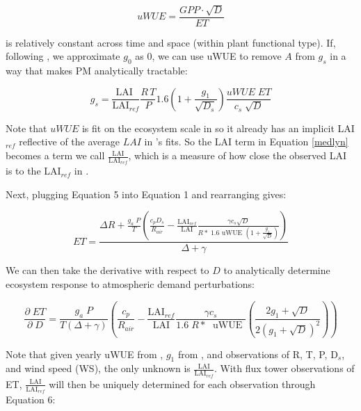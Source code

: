 \documentclass[draft,linenumbers]{agujournal}
\begin{document}
\begin{linenomath*}
  \begin{equation}
uWUE = \frac{GPP \cdot \sqrt{D}}{ET}
  \end{equation}
\end{linenomath*}
is relatively constant across time and space (within plant functional type). If, following \citet{Lin_2015}, we approximate $g_0$ as $0$, we can use uWUE to remove $A$ from $g_s$ in a way that makes PM analytically tractable:

\begin{linenomath*}
  \begin{equation}
  g_s = \frac{\text{LAI }}{\text{LAI$_{ref}$}} \frac{R \, T}{P} 1.6 \left(1 + \frac{g_1}{\sqrt{D_{s}}}\right) \frac{uWUE \; ET}{c_s \; \sqrt{D}}
  \end{equation}
\end{linenomath*}

Note that $uWUE$ is fit on the ecosystem scale in \citet{Zhou_2015} so it already has an implicit LAI$_{ref}$ reflective of the average $LAI$ in \citet{Zhou_2015}'s fits. So the LAI term in Equation \ref{medlyn} becomes a term we call $\frac{\text{LAI}}{\text{LAI$_{ref}$}}$, which is a measure of how close the observed LAI is to the LAI$_{ref}$ in \citet{Zhou_2015}.

Next, plugging Equation 5 into Equation 1 and rearranging gives:

\begin{linenomath*}
  \begin{equation}
  ET = \frac{\Delta R + \frac{g_a\; P}{T} \left( \frac{ c_p D_{s}}{R_{air}} - \frac{\text{LAI$_{ref}$}}{\text{LAI}}  \frac{\gamma c_s \sqrt{D} }{ R* \; 1.6 \text{ uWUE } (1 + \frac{g_1}{\sqrt{D}})} \right) }{ \Delta + \gamma}
  \end{equation}
\end{linenomath*}

We can then take the derivative with respect to $D$ to analytically determine ecosystem response to atmospheric demand perturbations:

\begin{linenomath*}
  \begin{equation}
    \frac{\partial \;  ET}{\partial \; D} = \frac{g_a \; P}{T(\Delta + \gamma)}   \left(\frac{ c_p}{R_{air}} - \frac{\text{LAI$_{ref}$}}{\text{LAI}} \frac{\gamma c_s }{1.6 \; R*\; \text{ uWUE }} \left( \frac{2 g_1 + \sqrt{D}}{2 (g_1 + \sqrt{D})^2}\right) \right)
    \label{d_et}
  \end{equation}
\end{linenomath*}
Note that given yearly uWUE from \citet{Zhou_2015}, $g_1$ from \citet{Lin_2015} \citep[as presented in ][]{Franks_2017}, and observations of R, T, P, D$_s$, and wind speed (WS), the only unknown is $\frac{\text{LAI}}{\text{LAI$_{ref}$}}$. With flux tower observations of ET, $\frac{\text{LAI}}{\text{LAI$_{ref}$}}$ will then be uniquely determined for each observation through Equation 6:
\end{document}
